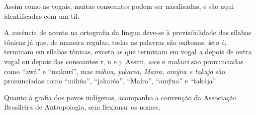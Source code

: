 
Assim como as vogais, muitas consoantes podem ser nasalisadas, e são
aqui identificadas com um til.

A ausência de acento na ortografia da língua deve-se à previsibilidade
das sílabas tônicas já que, de maneira regular, todas as palavras são
oxítonas, isto é, terminam em sílabas tônicas, exceto as que terminam em
vogal \emph{a} depois de outra vogal ou depois das consoantes r, n e j.
Assim, \emph{awa} e \emph{mukuri} são pronunciadas como ``awá'' e
``mukurí'', mas \emph{mihua}, \emph{jakarea, Maira, amỹna e takaja} são
pronunciadas como ``mihúa'', ``jakaréa'', ``Maíra'', ``amỹna'' e
``takája''.

Quanto à grafia dos povos indígenas, acompanho a convenção da Associação
Brasileira de Antropologia, sem flexionar os nomes.
